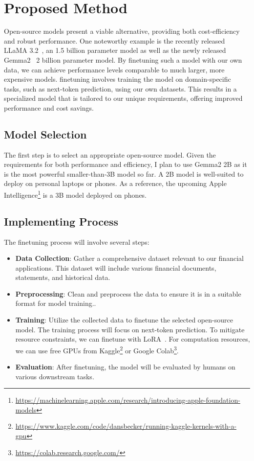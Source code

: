 \documentclass[11pt, a4paper]{article}
\begin{document}
\section{Proposed Method}
Open-source models present a viable alternative, providing both cost-efficiency and robust performance. One noteworthy example is the recently released LLaMA 3.2~\cite{llama3}, an 1.5 billion parameter model as well as the newly released Gemma2~\cite{gemma2} 2 billion parameter model. By finetuning such a model with our own data, we can achieve performance levels comparable to much larger, more expensive models. finetuning involves training the model on domain-specific tasks, such as next-token prediction, using our own datasets. This results in a specialized model that is tailored to our unique requirements, offering improved performance and cost savings.

\subsection{Model Selection}

The first step is to select an appropriate open-source model. Given the requirements for both performance and efficiency, I plan to use Gemma2 2B as it is the most powerful smaller-than-3B model so far. A 2B model is well-suited to deploy on personal laptops or phones. As a reference, the upcoming Apple Intelligence\footnote{\url{https://machinelearning.apple.com/research/introducing-apple-foundation-models}} is a 3B model deployed on phones.

\subsection{Implementing Process}

The finetuning process will involve several steps:

\begin{itemize}
    \item \textbf{Data Collection}: Gather a comprehensive dataset relevant to our financial applications. This dataset will include various financial documents, statements, and historical data.
    \item \textbf{Preprocessing}: Clean and preprocess the data to ensure it is in a suitable format for model training..
    \item \textbf{Training}: Utilize the collected data to finetune the selected open-source model. The training process will focus on next-token prediction. To mitigate resource constraints, we can finetune with LoRA~\cite{lora}. For computation resources, we can use free GPUs from Kaggle\footnote{\url{https://www.kaggle.com/code/dansbecker/running-kaggle-kernels-with-a-gpu}} or Google Colab\footnote{\url{https://colab.research.google.com/}}.
    \item \textbf{Evaluation}: After finetuning, the model will be evaluated by humans on various downstream tasks.
\end{itemize}
\end{document}
